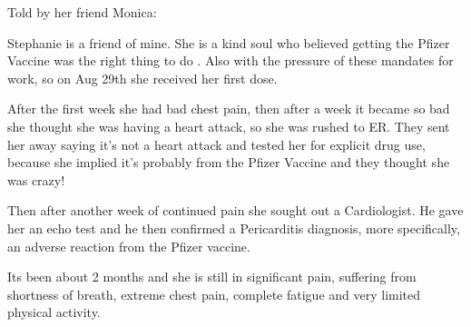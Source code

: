 Told by her friend Monica:

Stephanie is a friend of mine. She is a kind soul who believed getting the
Pfizer Vaccine was the right thing to do . Also with the pressure of these
mandates for work, so on Aug 29th she received her first dose.

After the first week she had bad chest pain, then after a week it became so bad
she thought she was having a heart attack, so she was rushed to ER. They sent
her away saying it’s not a heart attack and tested her for explicit drug use,
because she implied it’s probably from the Pfizer Vaccine and they thought she
was crazy!

Then after another week of continued pain she sought out a Cardiologist. He gave
her an echo test and he then confirmed a Pericarditis diagnosis, more
specifically, an adverse reaction from the Pfizer vaccine.

Its been about 2 months and she is still in significant pain, suffering from
shortness of breath, extreme chest pain, complete fatigue and very limited
physical activity.
